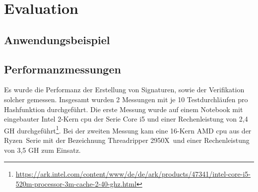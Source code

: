 
\chapter{Evaluation}
\label{ch:Evaluation}

\section{Anwendungsbeispiel}
\section{Performanzmessungen}
Es wurde die Performanz der Erstellung von Signaturen, sowie der Verifikation solcher gemessen. Insgesamt wurden 2 Messungen mit je 10 Testdurchläufen pro Hashfunktion durchgeführt. Die erste Messung wurde auf einem Notebook mit eingebauter Intel 2-Kern \gls{cpu} der Serie Core i5 und einer Rechenleistung von 2,4 GH durchgeführt\footnote{\url{https://ark.intel.com/content/www/de/de/ark/products/47341/intel-core-i5-520m-processor-3m-cache-2-40-ghz.html}}. Bei der zweiten Messung kam eine 16-Kern AMD \gls {cpu} aus der \glqq Ryzen\grqq~Serie mit der Bezeichnung \glqq Threadripper 2950X\grqq~und einer Rechenleistung von 3,5 GH zum Einsatz.\\

